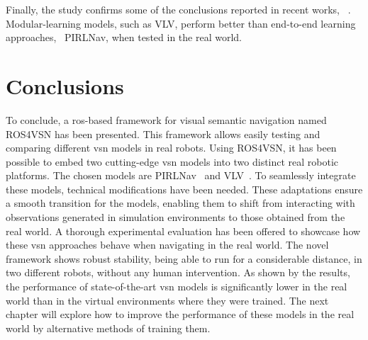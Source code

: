 Finally, the study confirms some of the conclusions reported in recent works, \eg~\cite{gervet2022}.
Modular-learning models, such as VLV, perform better than end-to-end learning approaches, \eg~PIRLNav, when tested in the real world.


\section{Conclusions}\label{sec:conclusions_ros4vsn}
To conclude, a \acrshort{ros}-based framework for visual semantic navigation named ROS4VSN has been presented.
This framework allows easily testing and comparing different \acrshort{vsn} models in real robots.
Using ROS4VSN, it has been possible to embed two cutting-edge \acrshort{vsn} models into two distinct real robotic platforms.
The chosen models are PIRLNav~\cite{ramrakhya2023} and VLV~\cite{chang2020}.
To seamlessly integrate these models, technical modifications have been needed.
These adaptations ensure a smooth transition for the models, enabling them to shift from interacting with observations generated in simulation environments to those obtained from the real world.
A thorough experimental evaluation has been offered to showcase how these \acrshort{vsn} approaches behave when navigating in the real world.
The novel framework shows robust stability, being able to run for a considerable distance, in two different robots, without any human intervention.
As shown by the results, the performance of state-of-the-art \acrshort{vsn} models is significantly lower in the real world than in the virtual environments where they were trained.
The next chapter will explore how to improve the performance of these models in the real world by alternative methods of training them.
